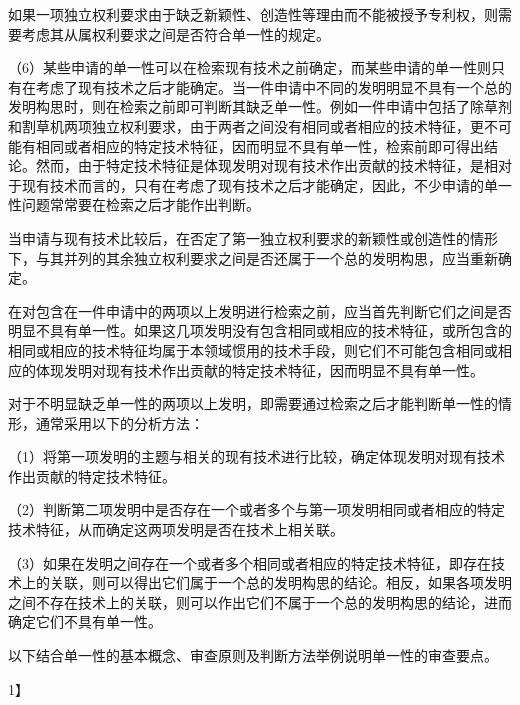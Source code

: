 如果一项独立权利要求由于缺乏新颖性、创造性等理由而不能被授予专利权，则需要考虑其从属权利要求之间是否符合单一性的规定。

{\setlength{\parindent}{17.1bp}（6）某些申请的单一性可以在检索现有技术之前确定，而某些申请的单一性则只有在考虑了现有技术之后才能确定。当一件申请中不同的发明明显不具有一个总的发明构思时，则在检索之前即可判断其缺乏单一性。例如一件申请中包括了除草剂和割草机两项独立权利要求，由于两者之间没有相同或者相应的技术特征，更不可能有相同或者相应的特定技术特征，因而明显不具有单一性，检索前即可得出结论。然而，由于特定技术特征是体现发明对现有技术作出贡献的技术特征，是相对于现有技术而言的，只有在考虑了现有技术之后才能确定，因此，不少申请的单一性问题常常要在检索之后才能作出判断。\par}

当申请与现有技术比较后，在否定了第一独立权利要求的新颖性或创造性的情形下，与其并列的其余独立权利要求之间是否还属于一个总的发明构思，应当重新确定。

在对包含在一件申请中的两项以上发明进行检索之前，应当首先判断它们之间是否明显不具有单一性。如果这几项发明没有包含相同或相应的技术特征，或所包含的相同或相应的技术特征均属于本领域惯用的技术手段，则它们不可能包含相同或相应的体现发明对现有技术作出贡献的特定技术特征，因而明显不具有单一性。

对于不明显缺乏单一性的两项以上发明，即需要通过检索之后才能判断单一性的情形，通常采用以下的分析方法：

{\setlength{\parindent}{17.1bp}（1）将第一项发明的主题与相关的现有技术进行比较，确定体现发明对现有技术作出贡献的特定技术特征。\par}

{\setlength{\parindent}{17.1bp}（2）判断第二项发明中是否存在一个或者多个与第一项发明相同或者相应的特定技术特征，从而确定这两项发明是否在技术上相关联。\par}

{\setlength{\parindent}{17.1bp}（3）如果在发明之间存在一个或者多个相同或者相应的特定技术特征，即存在技术上的关联，则可以得出它们属于一个总的发明构思的结论。相反，如果各项发明之间不存在技术上的关联，则可以作出它们不属于一个总的发明构思的结论，进而确定它们不具有单一性。\par}

以下结合单一性的基本概念、审查原则及判断方法举例说明单一性的审查要点。

{1{\kaiti 】}\par}


